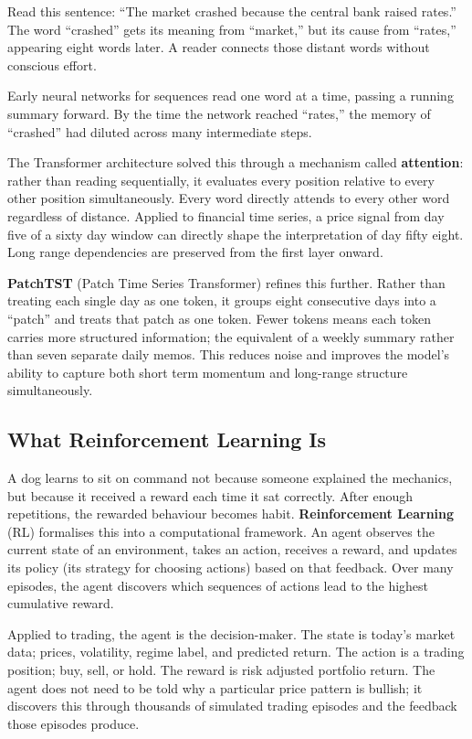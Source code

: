 \documentclass[journal]{IEEEtran}
\begin{document}
Read this sentence: ``The market crashed because the central bank raised
rates.'' The word ``crashed'' gets its meaning from ``market,'' but its
cause from ``rates,'' appearing eight words later. A reader connects those
distant words without conscious effort.

Early neural networks for sequences read one word at a time, passing a
running summary forward. By the time the network reached ``rates,'' the
memory of ``crashed'' had diluted across many intermediate steps.

The Transformer architecture solved this through a mechanism called
\textbf{attention}: rather than reading sequentially, it evaluates every
position relative to every other position simultaneously. Every word
directly attends to every other word regardless of distance. Applied to
financial time series, a price signal from day five of a sixty day window
can directly shape the interpretation of day fifty eight. Long range
dependencies are preserved from the first layer onward.

\textbf{PatchTST} (Patch Time Series Transformer) refines this further.
Rather than treating each single day as one token, it groups eight
consecutive days into a ``patch'' and treats that patch as one token.
Fewer tokens means each token carries more structured information; the
equivalent of a weekly summary rather than seven separate daily memos.
This reduces noise and improves the model's ability to capture both short
term momentum and long-range structure simultaneously.

\subsection{What Reinforcement Learning Is}

A dog learns to sit on command not because someone explained the mechanics,
but because it received a reward each time it sat correctly. After enough
repetitions, the rewarded behaviour becomes habit. \textbf{Reinforcement
Learning} (RL) formalises this into a computational framework. An agent
observes the current state of an environment, takes an action, receives
a reward, and updates its policy (its strategy for choosing actions)
based on that feedback. Over many episodes, the agent discovers which
sequences of actions lead to the highest cumulative reward.

Applied to trading, the agent is the decision-maker. The state is today's
market data; prices, volatility, regime label, and predicted return. The
action is a trading position; buy, sell, or hold. The reward is risk
adjusted portfolio return. The agent does not need to be told why a
particular price pattern is bullish; it discovers this through thousands
of simulated trading episodes and the feedback those episodes produce.
\end{document}
